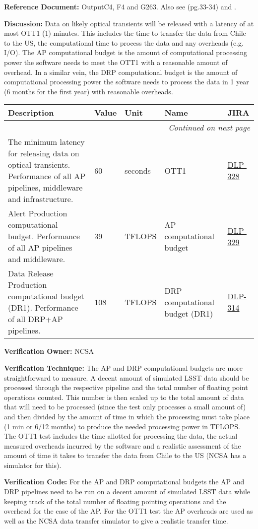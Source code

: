 \documentclass[DM,lsstdraft,toc]{lsstdoc}
\makeatletter
\newcommand{\jira}[1]{\href{https://jira.lsstcorp.org/browse/#1}{#1}}
\newenvironment{metric}[0]{%
\setlength\LTleft{0pt}
\setlength\LTright{\fill}
\begin{longtable}[]{@{}p{0.4\textwidth}lp{0.75in}p{1.3in}p{0.75in}@{}}

\hline \textbf{Description} & \textbf{Value} & \textbf{Unit} & \textbf{Name} & \textbf{JIRA} \\ \hline
\endhead

\hline \multicolumn{5}{r}{\emph{Continued on next page}} \\
\endfoot

\hline\hline
\endlastfoot
}{%
\hline
\end{longtable}
}
\makeatother
\begin{document}
\textbf{Reference Document:} \textbar{}Output\textbar{}C4, F4 and
\textbar{}G263. Also see \SRD (pg.33-34) and .

\textbf{Discussion:} Data on likely optical transients will be released
with a latency of at most OTT1 (1) minutes. This includes the time to
transfer the data from Chile to the US, the computational time to
process the data and any overheads (e.g. I/O). The AP computational
budget is the amount of computational processing power the software
needs to meet the OTT1 with a reasonable amount of overhead. In a
similar vein, the DRP computational budget is the amount of
computational processing power the software needs to process the data in
1 year (6 months for the first year) with reasonable overheads.

\begin{metric}
The minimum latency for releasing data on optical transients.
Performance of all AP pipelines, middleware and infrastructure. & 60 &
seconds & OTT1 & \jira{DLP-328}\tabularnewline
Alert Production computational budget. Performance of all AP pipelines
and middleware. & 39 & TFLOPS & AP computational budget &
\jira{DLP-329}\tabularnewline
Data Release Production computational budget (DR1). Performance of all
DRP+AP pipelines. & 108 & TFLOPS & DRP computational budget (DR1) &
\jira{DLP-314}\tabularnewline
\end{metric}

\textbf{Verification Owner:} NCSA

\textbf{Verification Technique:} The AP and DRP computational budgets
are more straightforward to measure. A decent amount of simulated LSST
data should be processed through the respective pipeline and the total
number of floating point operations counted. This number is then scaled
up to the total amount of data that will need to be processed (since the
test only processes a small amount of) and then divided by the amount of
time in which the processing must take place (1 min or 6/12 months) to
produce the needed processing power in TFLOPS. The OTT1 test includes
the time allotted for processing the data, the actual measured overheads
incurred by the software and a realistic assessment of the amount of
time it takes to transfer the data from Chile to the US (NCSA has a
simulator for this).

\textbf{Verification Code:} For the AP and DRP computational budgets the
AP and DRP pipelines need to be run on a decent amount of simulated LSST
data while keeping track of the total number of floating pointing
operations and the overhead for the case of the AP. For the OTT1 test
the AP overheads are used as well as the NCSA data transfer simulator to
give a realistic transfer time.
\end{document}
